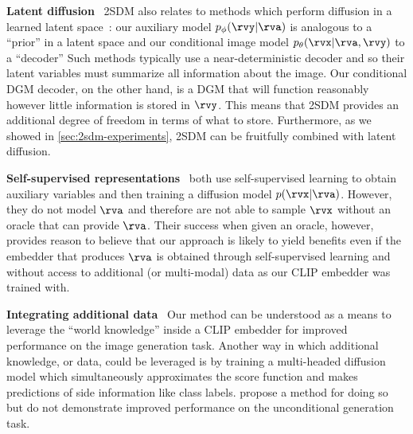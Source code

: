 \textbf{Latent diffusion}~
2SDM also relates to methods which perform diffusion in a learned latent space~\citep{rombach2022high}: our auxiliary model $p_\phi(\rvy|\rva)$ is analogous to a ``prior'' in a latent space and our conditional image model $p_\theta(\rvx|\rva,\rvy)$ to a ``decoder'' Such methods typically use a near-deterministic decoder and so their latent variables must summarize all information about the image. Our conditional DGM decoder, on the other hand, is a DGM that will function reasonably however little information is stored in $\rvy$. This means that 2SDM provides an additional degree of freedom in terms of what to store. Furthermore, as we showed in \cref{sec:2sdm-experiments}, 2SDM can be fruitfully combined with latent diffusion.

\textbf{Self-supervised representations}~
\citet{bao2022conditional,hu2022self} both use self-supervised learning to obtain auxiliary variables and then training a diffusion model $p(\rvx|\rva)$. However, they do not model $\rva$ and therefore are not able to sample $\rvx$ without an oracle that can provide $\rva$. Their success when given an oracle, however, provides reason to believe that our approach is likely to yield benefits even if the embedder that produces $\rva$ is obtained through self-supervised learning and without access to additional (or multi-modal) data as our CLIP embedder was trained with.

\textbf{Integrating additional data}~
Our method can be understood as a means to leverage the ``world knowledge'' inside a CLIP embedder for improved performance on the image generation task. Another way in which additional knowledge, or data, could be leveraged is by training a multi-headed diffusion model which simultaneously approximates the score function and makes predictions of side information like class labels. \citet{deja2023learning} propose a method for doing so but do not demonstrate improved performance on the unconditional generation task.


